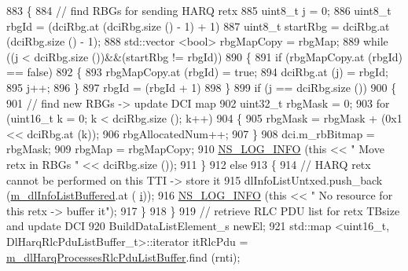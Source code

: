 \begin{DoxyCode}
883             \{
884               \textcolor{comment}{// find RBGs for sending HARQ retx}
885               uint8\_t j = 0;
886               uint8\_t rbgId = (dciRbg.at (dciRbg.size () - 1) + 1) %
887               uint8\_t startRbg = dciRbg.at (dciRbg.size () - 1);
888               std::vector <bool> rbgMapCopy = rbgMap;
889               \textcolor{keywordflow}{while} ((j < dciRbg.size ())&&(startRbg != rbgId))
890                 \{
891                   \textcolor{keywordflow}{if} (rbgMapCopy.at (rbgId) == \textcolor{keyword}{false})
892                     \{
893                       rbgMapCopy.at (rbgId) = \textcolor{keyword}{true};
894                       dciRbg.at (j) = rbgId;
895                       j++;
896                     \}
897                   rbgId = (rbgId + 1) %
898                 \}
899               \textcolor{keywordflow}{if} (j == dciRbg.size ())
900                 \{
901                   \textcolor{comment}{// find new RBGs -> update DCI map}
902                   uint32\_t rbgMask = 0;
903                   \textcolor{keywordflow}{for} (uint16\_t k = 0; k < dciRbg.size (); k++)
904                     \{
905                       rbgMask = rbgMask + (0x1 << dciRbg.at (k));
906                       rbgAllocatedNum++;
907                     \}
908                   dci.m\_rbBitmap = rbgMask;
909                   rbgMap = rbgMapCopy;
910                   \hyperlink{group__logging_gafbd73ee2cf9f26b319f49086d8e860fb}{NS\_LOG\_INFO} (\textcolor{keyword}{this} << \textcolor{stringliteral}{" Move retx in RBGs "} << dciRbg.size ());
911                 \}
912               \textcolor{keywordflow}{else}
913                 \{
914                   \textcolor{comment}{// HARQ retx cannot be performed on this TTI -> store it}
915                   dlInfoListUntxed.push\_back (\hyperlink{classns3_1_1TdBetFfMacScheduler_ad28a9447cadd7f80c4fe5d3801d8828b}{m\_dlInfoListBuffered}.at (
      \hyperlink{bernuolliDistribution_8m_a6f6ccfcf58b31cb6412107d9d5281426}{i}));
916                   \hyperlink{group__logging_gafbd73ee2cf9f26b319f49086d8e860fb}{NS\_LOG\_INFO} (\textcolor{keyword}{this} << \textcolor{stringliteral}{" No resource for this retx -> buffer it"});
917                 \}
918             \}
919           \textcolor{comment}{// retrieve RLC PDU list for retx TBsize and update DCI}
920           BuildDataListElement\_s newEl;
921           std::map <uint16\_t, DlHarqRlcPduListBuffer\_t>::iterator itRlcPdu =  
      \hyperlink{classns3_1_1TdBetFfMacScheduler_a066bceddaca3ed4a25974ada3aba3028}{m\_dlHarqProcessesRlcPduListBuffer}.find (rnti);

\end{DoxyCode}
